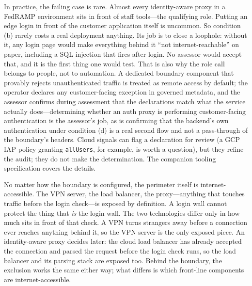 \documentclass[11pt]{article}
\newcommand{\code}[1]{\texttt{#1}}
\begin{document}
In practice, the failing case is rare. Almost every identity-aware proxy in a FedRAMP environment sits in front of staff tools---the qualifying role. Putting an edge login in front of the customer application itself is uncommon. So condition (b) rarely costs a real deployment anything. Its job is to close a loophole: without it, any login page would make everything behind it ``not internet-reachable'' on paper, including a SQL injection that fires after login. No assessor would accept that, and it is the first thing one would test. That is also why the role call belongs to people, not to automation. A dedicated boundary component that provably rejects unauthenticated traffic is treated as remote access by default; the operator declares any customer-facing exception in governed metadata, and the assessor confirms during assessment that the declarations match what the service actually does---determining whether an auth proxy is performing customer-facing authentication is the assessor's job, as is confirming that the backend's own authentication under condition (d) is a real second flow and not a pass-through of the boundary's headers. Cloud signals can flag a declaration for review (a GCP IAP policy granting \code{allUsers}, for example, is worth a question), but they refine the audit; they do not make the determination. The companion tooling specification covers the details.

No matter how the boundary is configured, the perimeter itself is internet-accessible. The VPN server, the load balancer, the proxy---anything that touches traffic before the login check---is exposed by definition. A login wall cannot protect the thing that \emph{is} the login wall. The two technologies differ only in how much sits in front of that check. A VPN turns strangers away before a connection ever reaches anything behind it, so the VPN server is the only exposed piece. An identity-aware proxy decides later: the cloud load balancer has already accepted the connection and parsed the request before the login check runs, so the load balancer and its parsing stack are exposed too. Behind the boundary, the exclusion works the same either way; what differs is which front-line components are internet-accessible.
\end{document}
